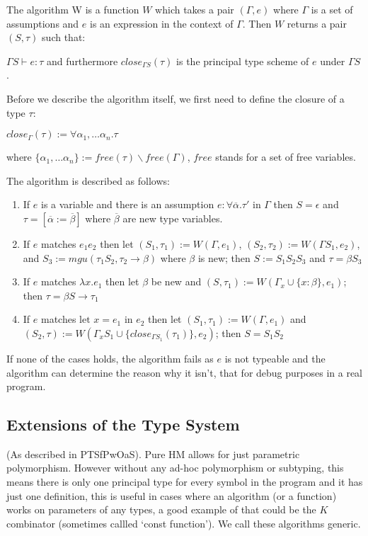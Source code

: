 The algorithm W is a function $W$ which takes a pair $(\Gamma, e)$ where $\Gamma$ is a set of assumptions and $e$ is an expression in the context of $\Gamma$. Then $W$ returns a pair $(S, \tau)$ such that:

$\Gamma S \vdash e : \tau$ and furthermore $close_{\Gamma S}(\tau)$ is the principal type scheme of $e$ under $\Gamma S$.

Before we describe the algorithm itself, we first need to define the closure of a type $\tau$:

$close_\Gamma(\tau) := \forall \alpha_1, \dots \alpha_n . \tau$

where $\{\alpha_1, \dots \alpha_n\} := free(\tau) \backslash free(\Gamma)$, $free$ stands for a set of free variables. %

The algorithm is described as follows:

\begin{enumerate}
    \item If $e$ is a variable and there is an assumption $e : \forall \overline{\alpha} . \tau'$ in $\Gamma$ then $S = \epsilon$ and $\tau = [\overline{\alpha} := \overline{\beta}]$ where $\overline{\beta}$ are new type variables.
    \item If $e$ matches $e_1 e_2$ then let $(S_1, \tau_1) := W(\Gamma, e_1)$, $(S_2, \tau_2) := W(\Gamma S_1, e_2)$, and $S_3 := mgu (\tau_1 S_2, \tau_2 \rightarrow \beta)$ where $\beta$ is new; then $S := S_1 S_2 S_3$ and $\tau = \beta S_3$
    \item If $e$ matches $\lambda x . e_1$ then let $\beta$ be new and $(S, \tau_1) := W(\Gamma_x \cup \{x : \beta\}, e_1)$; then $\tau = \beta S \rightarrow \tau_1$
    \item If $e$ matches $\text{let } x = e_1 \text{ in } e_2$ then let $(S_1, \tau_1) := W(\Gamma, e_1)$ and $(S_2, \tau) := W(\Gamma_x S_1 \cup \{close_{\Gamma S_1}(\tau_1)\}, e_2)$; then $S = S_1 S_2$
\end{enumerate}

If none of the cases holds, the algorithm fails as $e$ is not typeable and the algorithm can determine the reason why it isn't, that for debug purposes in a real program. %

\subsection{Extensions of the Type System}

(As described in PTSfPwOaS).
Pure HM allows for just parametric polymorphism. However without any ad-hoc polymorphism or subtyping, this means there is only one principal type for every symbol in the program and it has just one definition, this is useful in cases where an algorithm (or a function) works on parameters of any types, a good example of that could be the $K$ combinator (sometimes callled `const function'). We call these algorithms generic.

